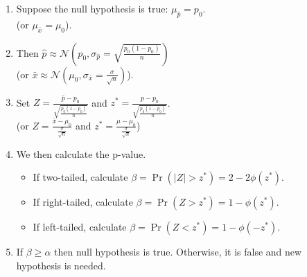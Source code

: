 \documentclass{ximera}
\begin{document}
\begin{enumerate}
\begin{itemize}
        \end{itemize}
       \item Suppose the null hypothesis is true: $\mu_{\hat p}=p_0$. \\
        (or $\mu_{\bar x}=\mu_0$).
        \item Then $\hat p\approx \mathcal N(p_0,\sigma_{\hat p}=\sqrt{\frac{p_0(1-p_0)}{n}})$ \\
        (or $\bar x\approx \mathcal N(\mu_0, \sigma_{\bar x}=\frac{\sigma}{\sqrt{n}}) $).
        \item Set $Z=\frac{\hat p-p_0}{\sqrt{\frac{p_0(1-p_0)}{n}}}$ and $z^*=\frac{p-p_0}{\sqrt{\frac{p_0(1-p_0)}{n}}}$.\\
        (or $Z=\frac{\bar x-\mu_0}{\frac{\sigma}{\sqrt{n}}}$ and $z^*=\frac{\mu -\mu_0}{\frac{\sigma}{\sqrt{n}}}$)
        \item We then calculate the p-value. 
        \begin{itemize}
            \item If two-tailed, calculate $\beta=\Pr\left(|Z|>z^*\right)=2-2\phi(z^*)$.
            \item If right-tailed, calculate $\beta=\Pr\left(Z>z^*\right)=1-\phi(z^*)$.
            \item If left-tailed, calculate $\beta=\Pr\left(Z<z^*\right)=1-\phi(-z^*)$.
        \end{itemize}
        \item If $\beta\geq \alpha$ then null hypothesis is true. Otherwise, it is false and new hypothesis is needed.
\end{enumerate}
\end{document}
